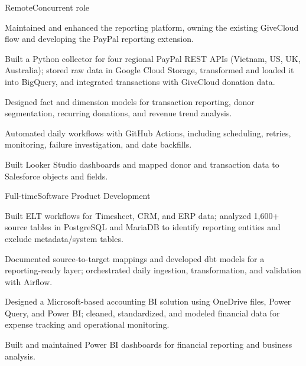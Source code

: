   {Remote\enspace\textbar\enspace Concurrent role}
\begin{cvbullets}
  \item Maintained and enhanced the reporting platform, owning the existing
    GiveCloud flow and developing the PayPal reporting extension.
  \item Built a Python collector for four regional PayPal REST APIs
    (Vietnam, US, UK, Australia); stored raw data in Google Cloud Storage,
    transformed and loaded it into BigQuery, and integrated transactions with
    GiveCloud donation data.
  \item Designed fact and dimension models for transaction reporting, donor
    segmentation, recurring donations, and revenue trend analysis.
  \item Automated daily workflows with GitHub Actions, including scheduling,
    retries, monitoring, failure investigation, and date backfills.
  \item Built Looker Studio dashboards and mapped donor and transaction data
    to Salesforce objects and fields.
\end{cvbullets}

\newpage
{}
  {Full-time\enspace\textbar\enspace Software Product Development}
\begin{cvbullets}
  \item Built ELT workflows for Timesheet, CRM, and ERP data; analyzed
    1,600+ source tables in PostgreSQL and MariaDB to identify reporting
    entities and exclude metadata/system tables.
  \item Documented source-to-target mappings and developed dbt models for a
    reporting-ready layer; orchestrated daily ingestion, transformation,
    and validation with Airflow.
\end{cvbullets}
\begin{cvbullets}
  \item Designed a Microsoft-based accounting BI solution using OneDrive
    files, Power Query, and Power BI; cleaned, standardized, and modeled
    financial data for expense tracking and operational monitoring.
  \item Built and maintained Power BI dashboards for financial reporting
    and business analysis.
\end{cvbullets}
